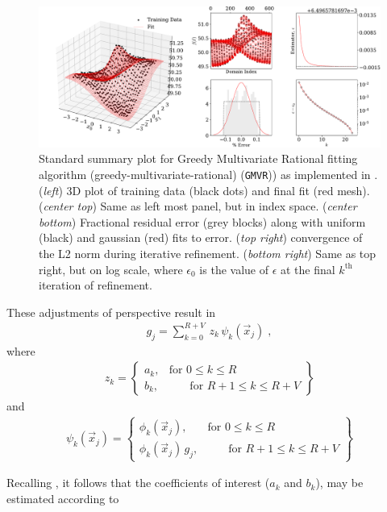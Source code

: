 \documentclass[twocolumn,aps,prd,floatfix,preprintnumbers,a4paper,nofootinbib,
superscriptaddress,10pt]{revtex4-1}
\def\gmvr#1{greedy-multivariate-rational#1
  (\texttt{GMVR}#1)\gdef\gmvr{\texttt{GMVR}}}
\begin{document}
\begin{figure}[htb]
  \includegraphics[width=\textwidth]{fig/issue3_summary.pdf}
	\caption{ Standard summary plot for Greedy Multivariate Rational fitting algorithm (\gmvr) as implemented in \cite{lionel_london_2018_1402516}. (\textit{left}) 3D plot of training data (black dots) and final fit (red mesh). (\textit{center top}) Same as left most panel, but in index space. (\textit{center bottom}) Fractional residual error (grey blocks) along with uniform (black) and gaussian (red) fits to error. (\textit{top right}) convergence of the L2 norm during iterative refinement. (\textit{bottom right}) Same as top right, but on log scale, where $\epsilon_0$ is the value of $\epsilon$ at the final $k^{\mathrm{th}}$ iteration of refinement. }
  \label{fig:gmvrtoy}
\end{figure}
%
These adjustments of perspective result in
%
\begin{align}
  \label{eq:rat3}
  g_j = \sum_{k=0}^{R+V} \, z_{k} \, \psi_k(\vec{x}_j) \;,
\end{align}
%
where
%
\begin{align}
  z_k = \left\{ \begin{array}{cc}
        a_k,      & \text{for }0\leq k\leq R\\
        b_k, & \quad \;\; \;\text{for }R+1\leq k\leq R+V
      \end{array} \right\}
\end{align}
%
and
%
\begin{align}
  \psi_k(\vec{x}_j) = \left\{\begin{array}{cc}
        \phi_k(\vec{x}_j),      & \text{for }0\leq k\leq R\\
        \phi_k(\vec{x}_j)\, g_j , & \quad \;\; \;\text{for }R+1\leq k\leq R+V
        \end{array} \right\}
\end{align}
%
\par Recalling , it follows that the coefficients of interest ($a_k$ and $b_k$), may be estimated according to
\end{document}
